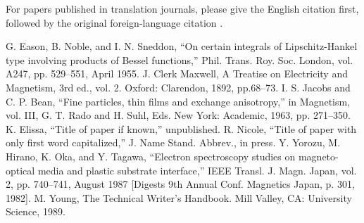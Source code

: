\documentclass[conference]{IEEEtran}
\begin{document}
For papers published in translation journals, please give the English 
citation first, followed by the original foreign-language citation \cite{b6}.

\begin{thebibliography}{00}
 G. Eason, B. Noble, and I. N. Sneddon, ``On certain integrals of Lipschitz-Hankel type involving products of Bessel functions,'' Phil. Trans. Roy. Soc. London, vol. A247, pp. 529--551, April 1955.
 J. Clerk Maxwell, A Treatise on Electricity and Magnetism, 3rd ed., vol. 2. Oxford: Clarendon, 1892, pp.68--73.
 I. S. Jacobs and C. P. Bean, ``Fine particles, thin films and exchange anisotropy,'' in Magnetism, vol. III, G. T. Rado and H. Suhl, Eds. New York: Academic, 1963, pp. 271--350.
 K. Elissa, ``Title of paper if known,'' unpublished.
 R. Nicole, ``Title of paper with only first word capitalized,'' J. Name Stand. Abbrev., in press.
 Y. Yorozu, M. Hirano, K. Oka, and Y. Tagawa, ``Electron spectroscopy studies on magneto-optical media and plastic substrate interface,'' IEEE Transl. J. Magn. Japan, vol. 2, pp. 740--741, August 1987 [Digests 9th Annual Conf. Magnetics Japan, p. 301, 1982].
 M. Young, The Technical Writer's Handbook. Mill Valley, CA: University Science, 1989.
\end{thebibliography}
\vspace{12pt}
\end{document}
